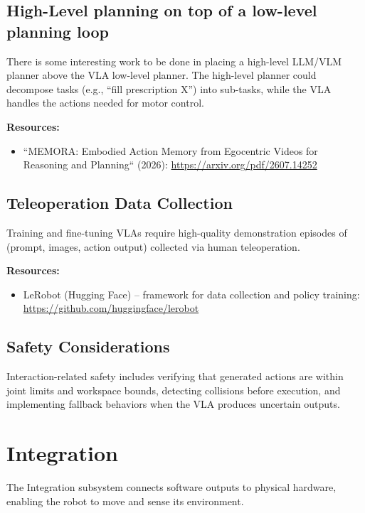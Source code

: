 \documentclass[11pt]{article}
\begin{document}
\subsection{High-Level planning on top of a low-level planning loop}
There is some interesting work to be done in placing a high-level LLM/VLM planner above the VLA low-level planner. The high-level planner could decompose tasks (e.g., ``fill prescription X'') into sub-tasks, while the VLA handles the actions needed for motor control.

\textbf{Resources:}
\begin{itemize}[nosep]
    \item ``MEMORA: Embodied Action Memory from Egocentric Videos for
Reasoning and Planning`` (2026): \url{https://arxiv.org/pdf/2607.14252}
\end{itemize}

\subsection{Teleoperation Data Collection}
Training and fine-tuning VLAs require high-quality demonstration episodes of (prompt, images, action output) collected via human teleoperation.

\textbf{Resources:}
\begin{itemize}[nosep]
    \item LeRobot (Hugging Face) -- framework for data collection and policy training: \url{https://github.com/huggingface/lerobot}
\end{itemize}

\subsection{Safety Considerations}
Interaction-related safety includes verifying that generated actions are within joint limits and workspace bounds, detecting collisions before execution, and implementing fallback behaviors when the VLA produces uncertain outputs.

\section{Integration}
\label{sec:integration}

The Integration subsystem connects software outputs to physical hardware, enabling the robot to move and sense its environment.
\end{document}
